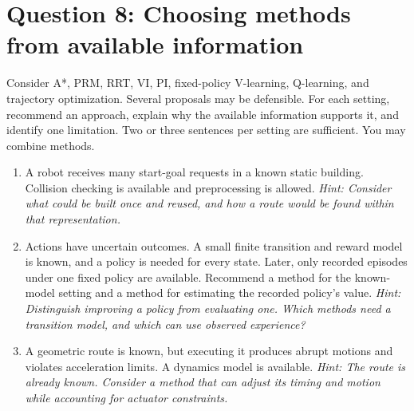 \documentclass[11pt]{article}
\newenvironment{studentanswer}[1]
  {\par\medskip\noindent
   \begin{tcolorbox}[height from=#1 to 100cm, colback=white, colframe=gray!60,
     boxrule=0.6pt, arc=0pt, outer arc=0pt, left=7pt, right=7pt,
     top=7pt, bottom=7pt, title={Answer / work}, fonttitle=\small,
     coltitle=black, colbacktitle=gray!8, titlerule=0pt]
   \ignorespaces}
  {\end{tcolorbox}\par}
\begin{document}
\section*{Question 8: Choosing methods from available information}
Consider A*, PRM, RRT, VI, PI, fixed-policy V-learning, Q-learning,
and trajectory optimization. Several proposals may be defensible.
For each setting, recommend an approach, explain why the available
information supports it, and identify one limitation. Two or three
sentences per setting are sufficient. You may combine methods.
\begin{enumerate}[label=(\alph*)]
\item \begin{minipage}[t]{\linewidth} A robot receives many start-goal requests in a known static
building. Collision checking is available and preprocessing is allowed.
\emph{Hint: Consider what could be built once and reused, and how a route
would be found within that representation.}

\begin{studentanswer}{4cm}
\end{studentanswer}

\end{minipage}
\item \begin{minipage}[t]{\linewidth} Actions have uncertain outcomes. A small finite transition and
reward model is known, and a policy is needed for every state. Later,
only recorded episodes under one fixed policy are available.
Recommend a method for the known-model setting and a method for estimating
the recorded policy's value.
\emph{Hint: Distinguish improving a policy from evaluating one. Which
methods need a transition model, and which can use observed experience?}

\begin{studentanswer}{4cm}
\end{studentanswer}

\end{minipage}
\item \begin{minipage}[t]{\linewidth} A geometric route is known, but executing it produces abrupt
motions and violates acceleration limits. A dynamics model is available.
\emph{Hint: The route is already known. Consider a method that can adjust
its timing and motion while accounting for actuator constraints.}

\begin{studentanswer}{4cm}
\end{studentanswer}

\end{minipage}
\end{enumerate}
\end{document}
